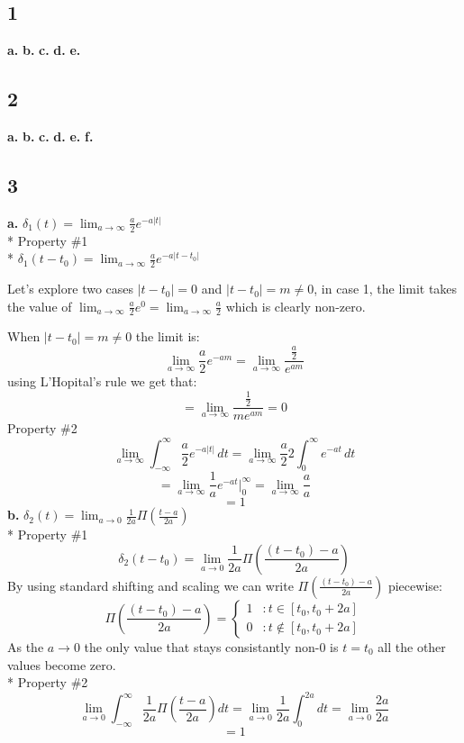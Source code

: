 \documentclass[12pt]{article}
\begin{document}
\subsection*{1}
\textbf{a.}
\textbf{b.}
\textbf{c.}
\textbf{d.}
\textbf{e.}
\subsection*{2}

\textbf{a.}
\textbf{b.}
\textbf{c.}
\textbf{d.}
\textbf{e.}
\textbf{f.}
\subsection*{3}
\textbf{a.}
$\delta_1(t) = \lim_{a \to \infty} \frac{a}{2} e^{-a|t|}$\\*
Property \#1 \\*
$\delta_1(t - t_0) = \lim_{a \to \infty} \frac{a}{2} e^{-a|t - t_0|}$

Let's explore two cases $|t - t_0| = 0$ and $|t - t_0| = m \neq 0$, in case 1, 
the limit takes the value of $\lim_{a \to \infty} \frac{a}{2} e^{0} = \lim_{a \to \infty} \frac{a}{2}$ 
which is clearly non-zero.

When $|t - t_0| = m \neq 0$ the limit is:
\[
\lim_{a \to \infty} \frac{a}{2} e^{-am} = 
\lim_{a \to \infty} \frac{\frac{a}{2} }{e^{am}}
\]
using L'Hopital's rule we get that:
\[ =
\lim_{a \to \infty} \frac{\frac{1}{2} }{me^{am}} = 0
\]
Property \#2
\[
\lim_{a \to \infty} \int_{-\infty}^{\infty}\frac{a}{2} e^{-a|t|}\,dt = 
\lim_{a \to \infty} \frac{a}{2} 2 \int_{0}^{\infty} e^{-at}\,dt 
\]
\[
= \lim_{a \to \infty} \frac{1}{a} e^{-at} |_{0}^{\infty}
= \lim_{a \to \infty} \frac{a}{a}
\]
\[= 1\]
\textbf{b.}
$\delta_2(t) = \lim_{a \to 0} \frac{1}{2a} \Pi(\frac{t - a}{2a})$\\*
Property \#1
\[
\delta_2(t - t_0) = \lim_{a \to 0} \frac{1}{2a} \Pi(\frac{(t -t_0) - a}{2a})
\]
By using standard shifting and scaling we can write $\Pi(\frac{(t -t_0) - a}{2a})$ piecewise:
\[\Pi(\frac{(t -t_0) - a}{2a}) = \left\{
  \begin{array}{lr}
    1 & : t \in [t_0, t_0 + 2a]\\
    0 & : t \not\in [t_0, t_0 + 2a]
  \end{array}
\right.
\]
As the $a \to 0$ the only value that stays consistantly non-0 is $t = t_0$
all the other values become zero.
\\*
Property \#2
\[
\lim_{a \to 0} \int_{-\infty}^{\infty}\frac{1}{2a} \Pi(\frac{t - a}{2a})dt = 
\lim_{a \to 0} \frac{1}{2a} \int_{0}^{2a}dt 
= \lim_{a \to 0} \frac{2a}{2a} 
\]
\[= 1\]
\end{document}
